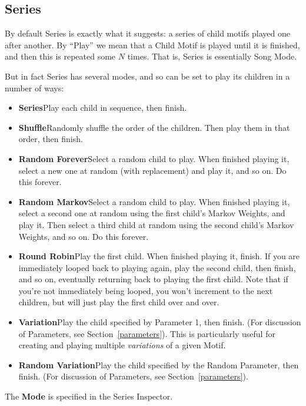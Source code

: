 \documentclass[twoside,10pt]{article}
\begin{document}
\subsection{Series}

By default Series is exactly what it suggests: a series of child motifs played one after another.   By ``Play'' we mean that a Child Motif is played until it is finished, and then this is repeated some \(N\) times.  That is, Series is essentially Song Mode.  

But in fact Series has several modes, and so can be set to play its children in a number of ways:

\begin{itemize}
\item{\bf Series}\quad Play each child in sequence, then finish.
\item{\bf Shuffle}\quad Randomly shuffle the order of the children.  Then play them in that order, then finish.
\item{\bf Random Forever}\quad Select a random child to play.  When finished playing it, select a new one at random (with replacement) and play it, and so on.  Do this forever.  
\item{\bf Random Markov}\quad Select a random child to play.  When finished playing it, select a second one at random using the first child's Markov Weights, and play it.  Then select a third child at random using the second child's Markov Weights, and so on.  Do this forever.
\item{\bf Round Robin}\quad Play the first child.  When finished playing it, finish.  If you are immediately looped back to playing again, play the second child, then finish, and so on, eventually returning back to playing the first child.  Note that if you're not immediately being looped, you won't increment to the next children, but will just play the first child over and over.
\item{\bf Variation}\quad Play the child specified by Parameter 1, then finish. (For discussion of Parameters, see Section~\ref{parameters}).  This is particularly useful for creating and playing multiple {\it variations} of a given Motif.
\item{\bf Random Variation}\quad Play the child specified by the Random Parameter, then finish. (For discussion of Parameters, see Section~\ref{parameters}).
\end{itemize}

The {\bf Mode} is specified in the Series Inspector.
\end{document}
